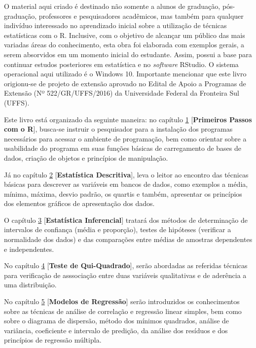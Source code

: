 \documentclass[12pt,brazil,oneside]{book}
\begin{document}
O material aqui criado é destinado não somente a alunos de graduação, pós-graduação, professores e pesquisadores acadêmicos, mas também para qualquer indivíduo interessado no aprendizado inicial sobre a utilização de técnicas estatísticas com o R. Inclusive, com o objetivo de alcançar um público das mais variadas áreas do conhecimento, esta obra foi elaborada com exemplos gerais, a serem absorvidos em um momento inicial do estudante. Assim, possui a base para continuar estudos posteriores em estatística e no \emph{software} RStudio. O sistema operacional aqui utilizado é o Windows 10. Importante mencionar que este livro origionu-se de projeto de extensão aprovado no Edital de Apoio a Programas de Extensão (Nº 522/GR/UFFS/2016) da Universidade Federal da Fronteira Sul (UFFS).

Este livro está organizado da seguinte maneira: no capítulo \protect\hyperlink{intro}{1} {[}\textbf{Primeiros Passos com o R}{]}, busca-se instruir o pesquisador para a instalação dos programas necessários para acessar o ambiente de programação, bem como orientar sobre a usabilidade do programa em suas funções básicas de carregamento de bases de dados, criação de objetos e princípios de manipulação.

Já no capítulo \protect\hyperlink{desc}{2} {[}\textbf{Estatística Descritiva}{]}, leva o leitor ao encontro das técnicas básicas para descrever as variáveis em bancos de dados, como exemplos a média, mínima, máxima, desvio padrão, os quartis e também, apresentar os princípios dos elementos gráficos de apresentação dos dados.

O capítulo \protect\hyperlink{inf}{3} {[}\textbf{Estatística Inferencial}{]} tratará dos métodos de determinação de intervalos de confiança (média e proporção), testes de hipóteses (verificar a normalidade dos dados) e das comparações entre médias de amostras dependentes e independentes.

No capítulo \protect\hyperlink{qui}{4} {[}\textbf{Teste de Qui-Quadrado}{]}, serão abordadas as referidas técnicas para verificação de asssociação entre duas variáveis qualitativas e de aderência a uma distribuição.

No capítulo \protect\hyperlink{reg}{5} {[}\textbf{Modelos de Regressão}{]} serão introduzidos os conhecimentos sobre as técnicas de análise de correlação e regressão linear simples, bem como sobre o diagrama de dispersão, método dos mínimos quadrados, análise de variância, coeficiente e intervalo de predição, da análise dos resíduos e dos princípios de regressão múltipla.
\end{document}
